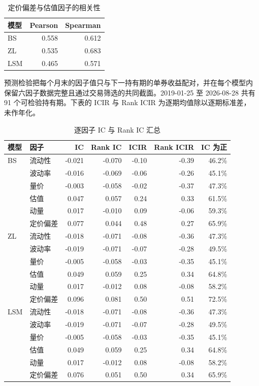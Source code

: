 \documentclass[11pt,a4paper]{ctexart}
\begin{document}
\begin{table}[h!]
  \centering
  \caption{定价偏差与估值因子的相关性}
  \begin{tabular}{lrr}
    \toprule
    模型 & Pearson & Spearman \\
    \midrule
    BS  & 0.558 & 0.612 \\
    ZL  & 0.535 & 0.683 \\
    LSM & 0.465 & 0.571 \\
    \bottomrule
  \end{tabular}
\end{table}

预测检验把每个月末的因子值只与下一持有期的单券收益配对，并在每个模型内
保留六因子数据完整且通过交易筛选的共同截面。2019-01-25 至 2026-08-28
共有 91 个可检验持有期。下表的 ICIR 与 Rank ICIR 为逐期均值除以逐期标准差，
未作年化。

\begin{table}[h!]
  \centering
  \caption{逐因子 IC 与 Rank IC 汇总}
  \scriptsize
  \setlength{\tabcolsep}{3.3pt}
  \begin{tabular}{llrrrrr}
    \toprule
    模型 & 因子 & IC & Rank IC & ICIR & Rank ICIR & IC 为正 \\
    \midrule
    BS & 流动性 & -0.021 & -0.070 & -0.10 & -0.39 & 46.2\% \\
       & 波动率 & -0.016 & -0.069 & -0.06 & -0.26 & 45.1\% \\
       & 量价 & -0.003 & -0.058 & -0.02 & -0.37 & 47.3\% \\
       & 估值 & 0.047 & 0.057 & 0.24 & 0.33 & 61.5\% \\
       & 动量 & 0.017 & -0.010 & 0.09 & -0.06 & 59.3\% \\
       & 定价偏差 & 0.077 & 0.044 & 0.48 & 0.27 & 65.9\% \\
    \midrule
    ZL & 流动性 & -0.018 & -0.071 & -0.08 & -0.36 & 47.3\% \\
       & 波动率 & -0.019 & -0.071 & -0.07 & -0.28 & 49.5\% \\
       & 量价 & -0.005 & -0.058 & -0.03 & -0.35 & 45.1\% \\
       & 估值 & 0.049 & 0.059 & 0.25 & 0.34 & 64.8\% \\
       & 动量 & 0.017 & -0.012 & 0.08 & -0.08 & 58.2\% \\
       & 定价偏差 & 0.096 & 0.081 & 0.50 & 0.51 & 72.5\% \\
    \midrule
    LSM & 流动性 & -0.018 & -0.071 & -0.08 & -0.36 & 47.3\% \\
        & 波动率 & -0.019 & -0.071 & -0.07 & -0.28 & 49.5\% \\
        & 量价 & -0.005 & -0.058 & -0.03 & -0.35 & 45.1\% \\
        & 估值 & 0.049 & 0.059 & 0.25 & 0.34 & 64.8\% \\
        & 动量 & 0.017 & -0.012 & 0.08 & -0.08 & 58.2\% \\
        & 定价偏差 & 0.076 & 0.051 & 0.50 & 0.34 & 65.9\% \\
    \bottomrule
  \end{tabular}
\end{table}
\end{document}
